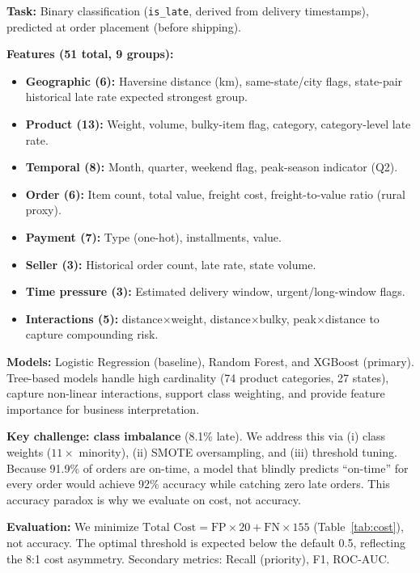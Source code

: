 \documentclass[11pt,a4paper]{article}
\begin{document}
\textbf{Task:} Binary classification (\texttt{is\_late}, derived from delivery timestamps), predicted at order placement (before shipping).

\textbf{Features (51 total, 9 groups):}
\begin{itemize}[noitemsep,topsep=2pt]
    \item \textbf{Geographic (6):} Haversine distance (km), same-state/city flags, state-pair historical late rate expected strongest group.
    \item \textbf{Product (13):} Weight, volume, bulky-item flag, category, category-level late rate.
    \item \textbf{Temporal (8):} Month, quarter, weekend flag, peak-season indicator (Q2).
    \item \textbf{Order (6):} Item count, total value, freight cost, freight-to-value ratio (rural proxy).
    \item \textbf{Payment (7):} Type (one-hot), installments, value.
    \item \textbf{Seller (3):} Historical order count, late rate, state volume.
    \item \textbf{Time pressure (3):} Estimated delivery window, urgent/long-window flags.
    \item \textbf{Interactions (5):} distance$\times$weight, distance$\times$bulky, peak$\times$distance to capture compounding risk.
\end{itemize}

\textbf{Models:} Logistic Regression (baseline), Random Forest, and XGBoost (primary). Tree-based models handle high cardinality (74 product categories, 27 states), capture non-linear interactions, support class weighting, and provide feature importance for business interpretation.

\textbf{Key challenge: class imbalance} (8.1\% late). We address this via (i) class weights ($11\times$ minority), (ii) SMOTE oversampling, and (iii) threshold tuning. Because 91.9\% of orders are on-time, a model that blindly predicts ``on-time'' for every order would achieve 92\% accuracy while catching zero late orders. This accuracy paradox is why we evaluate on cost, not accuracy.

\textbf{Evaluation:} We minimize $\text{Total Cost} = \text{FP}\times 20 + \text{FN}\times 155$ (Table~\ref{tab:cost}), not accuracy. The optimal threshold is expected below the default 0.5, reflecting the 8:1 cost asymmetry. Secondary metrics: Recall (priority), F1, ROC-AUC.
\end{document}
